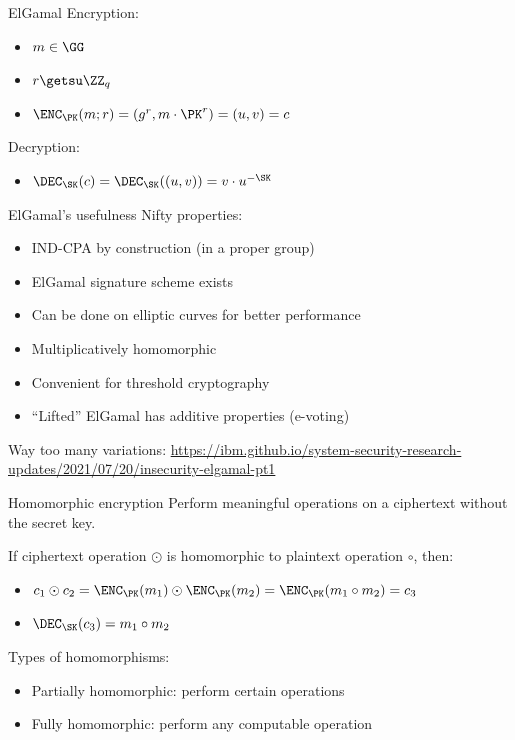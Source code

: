 \begin{frame}{ElGamal}
  Encryption:
  \begin{itemize}[<+(1)->]
    \item $m\in\GG$
    \item $r\getsu\ZZ_q$
    \item $\ENC_\PK(m; r) = (g^r, m\cdot \PK^r) = (u, v) = c$
  \end{itemize}

  \vspace*{2em}

  \pause
  Decryption:
  \begin{itemize}
    \item $\DEC_\SK(c) = \DEC_\SK((u, v)) = v \cdot u^{-\SK}$
  \end{itemize}
\end{frame}

\begin{frame}{ElGamal's usefulness}
  Nifty properties:
  \begin{itemize}[<+(1)->]
    \item IND-CPA by construction (in a proper group)
    \item ElGamal signature scheme exists
    \item Can be done on elliptic curves for better performance
    \item Multiplicatively homomorphic
    \item Convenient for threshold cryptography
    \item \enquote{Lifted} ElGamal has additive properties (e-voting)
  \end{itemize}

  \pause
  Way too many variations: {\scriptsize\url{https://ibm.github.io/system-security-research-updates/2021/07/20/insecurity-elgamal-pt1}}
\end{frame}

\begin{frame}{Homomorphic encryption}
  Perform meaningful operations on a ciphertext without the secret key.

  \vspace*{1em}

  \pause
  If ciphertext operation $\odot$ is homomorphic to plaintext operation $\circ$, then:
  \begin{itemize}[<+(1)->]
    \item $c_1 \odot c_2 = \ENC_\PK(m_1) \odot \ENC_\PK(m_2) = \ENC_\PK(m_1 \circ m_2) = c_3$
    \item $\DEC_\SK(c_3) = m_1 \circ m_2$
  \end{itemize}

  \vspace*{1em}

  \pause
  Types of homomorphisms:
  \begin{itemize}[<+(1)->]
    \item Partially homomorphic: perform certain operations
    \item Fully homomorphic: perform any computable operation
  \end{itemize}
\end{frame}

